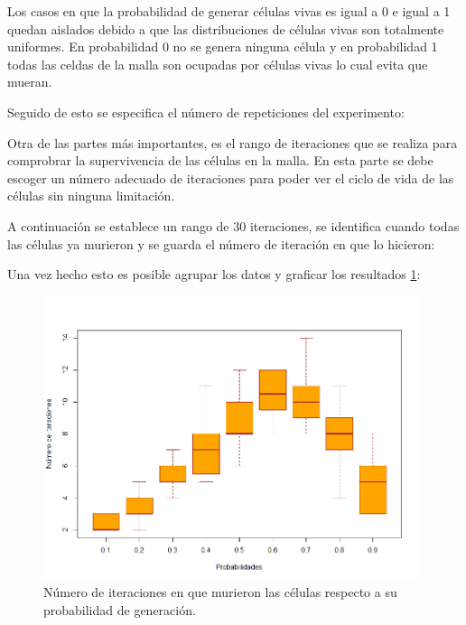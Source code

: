 \documentclass{article}
\begin{document}
Los casos en que la probabilidad de generar células vivas es igual a 0 e igual a 1 quedan aislados debido a que las distribuciones de células vivas son totalmente uniformes. En probabilidad 0 no se genera ninguna célula y en probabilidad 1 todas las celdas de la malla son ocupadas por células vivas lo cual evita que mueran.

Seguido de esto se especifica el número de repeticiones del experimento:



Otra de las partes más importantes, es el rango de iteraciones que se realiza para comprobrar la supervivencia de las células en la malla.
En esta parte se debe escoger un número adecuado de iteraciones para poder ver el ciclo de vida de las células sin ninguna limitación.

A continuación se establece un rango de 30 iteraciones, se identifica cuando todas las células ya murieron y se guarda el número de iteración en que lo hicieron:

 

Una vez hecho esto es posible agrupar los datos y graficar los resultados \ref{a}:

 
 

\begin{figure}[h]
\centering\includegraphics[width = 110mm]{numit.png}
\caption{Número de iteraciones en que murieron las células respecto a su probabilidad de generación.}\label{a}
\end{figure}
\end{document}
